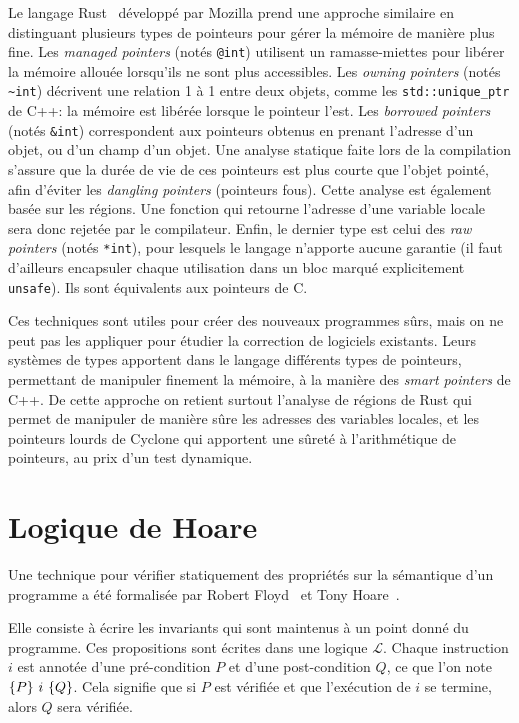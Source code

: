 Le langage Rust~ développé par Mozilla prend une approche similaire
en distinguant plusieurs types de pointeurs pour gérer la mémoire de manière
plus fine. Les \emph{managed pointers} (notés \texttt{@int}) utilisent un
ramasse-miettes pour libérer la mémoire allouée lorsqu'ils ne sont plus
accessibles. Les \emph{owning pointers} (notés \texttt{\textasciitilde{}int})
décrivent une relation 1 à 1 entre deux objets, comme les
\texttt{std::unique\_ptr} de C++: la mémoire est libérée lorsque le pointeur
l'est. Les \emph{borrowed pointers} (notés \texttt{\&int}) correspondent aux
pointeurs obtenus en prenant l'adresse d'un objet, ou d'un champ d'un objet. Une
analyse statique faite lors de la compilation s'assure que la durée de vie de
ces pointeurs est plus courte que l'objet pointé, afin d'éviter les
\emph{dangling pointers} (pointeurs fous). Cette analyse est également basée sur
les régions. Une fonction qui retourne l'adresse d'une variable locale sera donc
rejetée par le compilateur. Enfin, le dernier type est celui des \emph{raw
pointers} (notés \texttt{*int}), pour lesquels le langage n'apporte aucune
garantie (il faut d'ailleurs encapsuler chaque utilisation dans un bloc marqué
explicitement \texttt{unsafe}). Ils sont équivalents aux pointeurs de C.

Ces techniques sont utiles pour créer des nouveaux programmes sûrs, mais on ne
peut pas les appliquer pour étudier la correction de logiciels existants. Leurs
systèmes de types apportent dans le langage différents types de pointeurs,
permettant de manipuler finement la mémoire, à la manière des \emph{smart
pointers} de C++. De cette approche on retient surtout l'analyse de régions de
Rust qui permet de manipuler de manière sûre les adresses des variables locales,
et les pointeurs lourds de Cyclone qui apportent une sûreté à l'arithmétique de
pointeurs, au prix d'un test dynamique.


\section{Logique de Hoare}

Une technique pour vérifier statiquement des propriétés sur la sémantique d'un
programme a été formalisée par Robert Floyd~\cite{FloydMeaning} et Tony
Hoare~\cite{hoare}.

Elle consiste à écrire les invariants qui sont maintenus à un point donné du
programme. Ces propositions sont écrites dans une logique $\mathcal{L}$. Chaque
instruction $i$ est annotée d'une pré-condition $P$ et d'une post-condition $Q$,
ce que l'on note $\{P\}~i~\{Q\}$. Cela signifie que si $P$ est vérifiée et que
l'exécution de $i$ se termine, alors $Q$ sera vérifiée.

